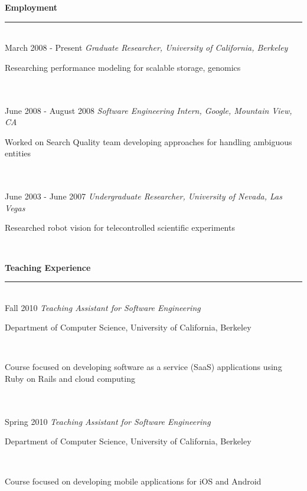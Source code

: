\documentclass[11pt]{article}
\newcommand{\parwidth}{4.8 in}
\newcommand{\tabwidth}{2.0 in}
\newcommand{\head}[1]{
{\bf #1} \\
\rule{\textwidth}{0.01 in}

\vspace{-0.35 in}

}
\begin{document}
\head{Employment}

\begin{tabbing}
\hspace{\tabwidth} \= \\ 
March 2008 - Present \> \emph{Graduate Researcher, University of California, Berkeley} \\ 
\> \parbox[t]{\parwidth}{
Researching performance modeling for scalable storage, genomics
}\\

\hspace{\tabwidth} \= \\ 
June 2008 - August 2008 \> \emph{Software Engineering Intern, Google, Mountain View, CA} \\ 
\> \parbox[t]{\parwidth}{
Worked on Search Quality team developing approaches for handling ambiguous entities
}\\

\hspace{\tabwidth} \= \\ 
June 2003 - June 2007 \> \emph{Undergraduate Researcher, University of Nevada, Las Vegas} \\ 
\> \parbox[t]{\parwidth}{
Researched robot vision for telecontrolled scientific experiments
}\\

\end{tabbing}
\head{Teaching Experience}

\begin{tabbing}
\hspace{\tabwidth} \= \\

Fall 2010 \> \emph{Teaching Assistant for Software Engineering}\\
\> \parbox[t]{\parwidth}{Department of Computer Science, University of California, Berkeley} \\ 
\> \parbox[t]{\parwidth}{Course focused on developing software as a service (SaaS) applications using Ruby on Rails and cloud computing} \\ \\

Spring 2010 \> \emph{Teaching Assistant for Software Engineering} \\
\> \parbox[t]{\parwidth}{Department of Computer Science, University of California, Berkeley} \\ 
\> \parbox[t]{\parwidth}{Course focused on developing mobile applications for iOS and Android} \\ 

\end{tabbing}
\end{document}
